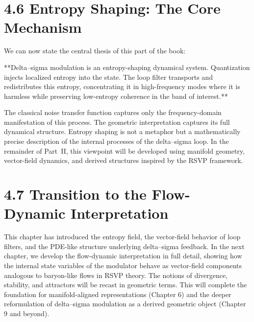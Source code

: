 \section*{4.6 Entropy Shaping: The Core Mechanism}

We can now state the central thesis of this part of the book:

**Delta--sigma modulation is an entropy-shaping dynamical system. Quantization injects localized entropy into the state. The loop filter transports and redistributes this entropy, concentrating it in high-frequency modes where it is harmless while preserving low-entropy coherence in the band of interest.**

The classical noise transfer function captures only the frequency-domain manifestation of this process. The geometric interpretation captures its full dynamical structure. Entropy shaping is not a metaphor but a mathematically precise description of the internal processes of the delta--sigma loop. In the remainder of Part~II, this viewpoint will be developed using manifold geometry, vector-field dynamics, and derived structures inspired by the RSVP framework.

\section*{4.7 Transition to the Flow-Dynamic Interpretation}

This chapter has introduced the entropy field, the vector-field behavior of loop filters, and the PDE-like structure underlying delta--sigma feedback. In the next chapter, we develop the flow-dynamic interpretation in full detail, showing how the internal state variables of the modulator behave as vector-field components analogous to baryon-like flows in RSVP theory. The notions of divergence, stability, and attractors will be recast in geometric terms. This will complete the foundation for manifold-aligned representations (Chapter 6) and the deeper reformulation of delta--sigma modulation as a derived geometric object (Chapter 9 and beyond).
